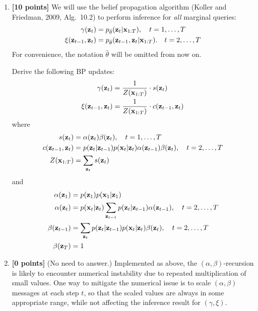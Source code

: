\documentclass{article}
\begin{document}
\begin{enumerate}
 
 
 
\item 
\textbf{[10 points]}
We will use the belief propagation algorithm (Koller and Friedman, 2009, Alg.~10.2) to perform inference for \emph{all} marginal queries:
\begin{align}
\gamma(\mathbf{z}_t) & = p_{\hat{\theta}} (\mathbf{z}_t | \mathbf{x}_{1:T}),  \quad t = 1, \dotsc, T \\
\xi(\mathbf{z}_{t-1}, \mathbf{z}_t) & = p_{\hat{\theta}} (\mathbf{z}_{t-1}, \mathbf{z}_t | \mathbf{x}_{1:T}). \quad t = 2, \dotsc, T
\end{align}
For convenience, the notation $ \hat{\theta} $ will be omitted from now on. 

Derive the following BP updates:
\begin{align}
\gamma(\mathbf{z}_t) 
& = \frac{1}{Z(\mathbf{x}_{1:T})}  \cdot  s (\mathbf{z}_t) \\
\xi(\mathbf{z}_{t-1}, \mathbf{z}_t) 
& = \frac{1}{Z(\mathbf{x}_{1:T})}  \cdot  c (\mathbf{z}_{t-1}, \mathbf{z}_t) \\
\end{align}
where 
\begin{align}
s (\mathbf{z}_t)
& = \alpha (\mathbf{z}_t) \beta (\mathbf{z}_t), \quad t = 1, \dotsc, T \\
c (\mathbf{z}_{t-1}, \mathbf{z}_t) 
& = p(\mathbf{z}_t | \mathbf{z}_{t-1}) p(\mathbf{x}_t | \mathbf{z}_t) \alpha  (\mathbf{z}_{t-1}) \beta (\mathbf{z}_t), \quad t = 2, \dotsc, T \\
Z(\mathbf{x}_{1:T})
& = \sum_{\mathbf{z}_t} s (\mathbf{z}_t)
\end{align}
and 
\begin{align}
\alpha (\mathbf{z}_1) 
& = p(\mathbf{z}_1) p(\mathbf{x}_1 | \mathbf{z}_1)  \\
\alpha (\mathbf{z}_t) 
& = p(\mathbf{x}_t | \mathbf{z}_t) \sum_{\mathbf{z}_{t-1}} p(\mathbf{z}_t | \mathbf{z}_{t-1})  \alpha (\mathbf{z}_{t-1}), \quad t = 2, \dotsc, T \\
\beta (\mathbf{z}_{t-1})
& = \sum_{\mathbf{z}_t}  p(\mathbf{z}_t | \mathbf{z}_{t-1})   p(\mathbf{x}_t | \mathbf{z}_t)  \beta (\mathbf{z}_t) ,
\quad t = 2, \dotsc, T  \\
\beta (\mathbf{z}_T) 
& = 1
\end{align}








\item 
\textbf{[0 points]} 
(No need to answer.)
Implemented as above, the $ (\alpha, \beta) $-recursion is likely to encounter numerical instability due to repeated multiplication of small values. 
One way to mitigate the numerical issue is to scale $ (\alpha, \beta) $ messages at each step $ t $, so that the scaled values are always in some appropriate range, while not affecting the inference result for $ (\gamma, \xi) $. 




\end{enumerate}
\end{document}
